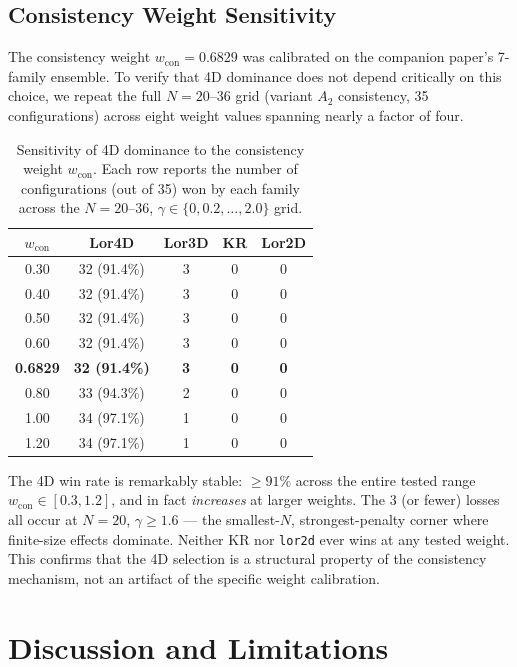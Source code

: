 \documentclass[11pt,a4paper]{article}
\begin{document}
\subsection{Consistency Weight Sensitivity}\label{sec:wcon}

The consistency weight $w_{\text{con}} = 0.6829$ was calibrated on the companion paper's 7-family ensemble. To verify that 4D dominance does not depend critically on this choice, we repeat the full $N = 20$--$36$ grid (variant $A_2$ consistency, 35 configurations) across eight weight values spanning nearly a factor of four.

\begin{table}[H]
\centering
\caption{Sensitivity of 4D dominance to the consistency weight $w_{\text{con}}$. Each row reports the number of configurations (out of 35) won by each family across the $N = 20$--$36$, $\gamma \in \{0, 0.2, \ldots, 2.0\}$ grid.}
\label{tab:wcon}
\begin{tabular}{ccccc}
\toprule
$w_{\text{con}}$ & \textbf{Lor4D} & \textbf{Lor3D} & \textbf{KR} & \textbf{Lor2D} \\
\midrule
0.30 & 32 (91.4\%) & 3 & 0 & 0 \\
0.40 & 32 (91.4\%) & 3 & 0 & 0 \\
0.50 & 32 (91.4\%) & 3 & 0 & 0 \\
0.60 & 32 (91.4\%) & 3 & 0 & 0 \\
\textbf{0.6829} & \textbf{32 (91.4\%)} & \textbf{3} & \textbf{0} & \textbf{0} \\
0.80 & 33 (94.3\%) & 2 & 0 & 0 \\
1.00 & 34 (97.1\%) & 1 & 0 & 0 \\
1.20 & 34 (97.1\%) & 1 & 0 & 0 \\
\bottomrule
\end{tabular}
\end{table}

The 4D win rate is remarkably stable: $\geq 91\%$ across the entire tested range $w_{\text{con}} \in [0.3, 1.2]$, and in fact \emph{increases} at larger weights. The 3 (or fewer) losses all occur at $N = 20$, $\gamma \geq 1.6$ --- the smallest-$N$, strongest-penalty corner where finite-size effects dominate. Neither KR nor \texttt{lor2d} ever wins at any tested weight. This confirms that the 4D selection is a structural property of the consistency mechanism, not an artifact of the specific weight calibration.

\section{Discussion and Limitations}
\end{document}
